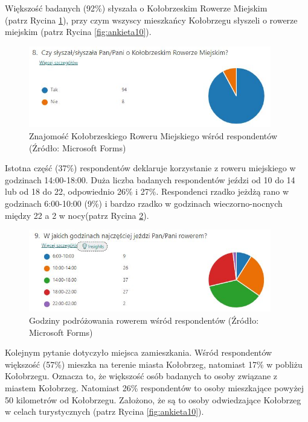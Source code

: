 \documentclass{amuthesis}
\begin{document}
Większość badanych (92\%) słyszała o Kołobrzeskim Rowerze Miejskim\\
(patrz Rycina \ref{fig:ankieta8}), przy czym wszyscy mieszkańcy Kołobrzegu słyszeli o rowerze miejskim (patrz Rycina \ref{fig:ankieta10}).

\begin{figure}[t]

{\centering \includegraphics[width=400px]{figures/ankieta/8} 

}

\caption{Znajomość Kołobrzeskiego Roweru Miejskiego wśród respondentów (Źródło: Microsoft Forms)}\label{fig:ankieta8}
\end{figure}

Istotna część (37\%) respondentów deklaruje korzystanie z roweru miejskiego w godzinach 14:00-18:00.
Duża liczba badanych respondentów jeździ od 10 do 14 lub od 18 do 22, odpowiednio 26\% i 27\%.
Respondenci rzadko jeżdżą rano w godzinach 6:00-10:00 (9\%) i bardzo rzadko w godzinach wieczorno-nocnych między 22 a 2 w nocy(patrz Rycina \ref{fig:ankieta9}).

\begin{figure}[t]

{\centering \includegraphics[width=400px]{figures/ankieta/9} 

}

\caption{Godziny podróżowania rowerem wśród respondentów (Źródło: Microsoft Forms)}\label{fig:ankieta9}
\end{figure}

Kolejnym pytanie dotyczyło miejsca zamieszkania.
Wśród respondentów większość (57\%) mieszka na terenie miasta Kołobrzeg, natomiast 17\% w pobliżu Kołobrzegu. Oznacza to, że większość osób badanych to osoby związane z miastem Kołobrzeg.
Natomiast 26\% respondentów to osoby mieszkające powyżej 50 kilometrów od Kołobrzegu.
Założono, że są to osoby odwiedzające Kołobrzeg w celach turystycznych (patrz Rycina \ref{fig:ankieta10}).
\end{document}
